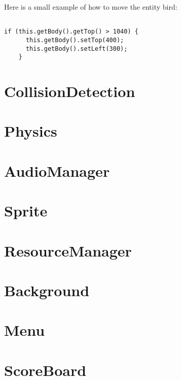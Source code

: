 Here is a small example of how to move the entity bird:
\begin{lstlisting}

if (this.getBody().getTop() > 1040) {
      this.getBody().setTop(400);
      this.getBody().setLeft(300);
    }
\end{lstlisting}

\section{CollisionDetection}
\section{Physics}
\section{AudioManager}
\section{Sprite}
\section{ResourceManager}
\section{Background}
\section{Menu}
\section{ScoreBoard}

